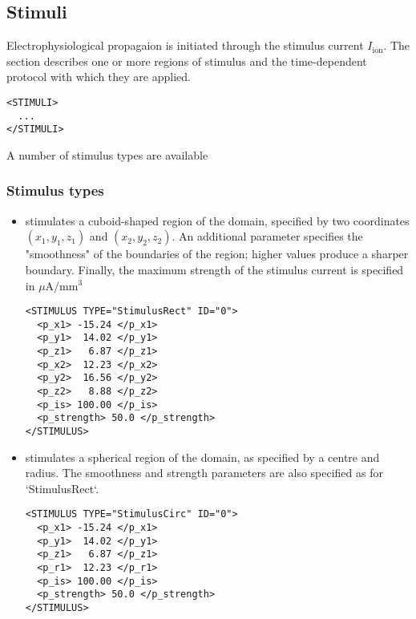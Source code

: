 \subsection{Stimuli}
Electrophysiological propagaion is initiated through the stimulus current 
$I_{\mathrm{ion}}$. The  section describes one or more regions of
stimulus and the time-dependent protocol with which they are applied.
\begin{lstlisting}[style=XmlStyle]
<STIMULI>
  ...
</STIMULI>
\end{lstlisting}
A number of stimulus types are available

\subsubsection{Stimulus types}
\begin{itemize}
    \item {} stimulates a cuboid-shaped region of the domain,
    specified by two coordinates $(x_1,y_1,z_1)$ and $(x_2,y_2,z_2)$.
    An additional parameter specifies the "smoothness" of the boundaries of the
    region; higher values produce a sharper boundary. Finally, the maximum 
    strength of the stimulus current is specified in $\mu \mathrm{A} / \mathrm{mm}^3$
\begin{lstlisting}[style=XmlStyle]
<STIMULUS TYPE="StimulusRect" ID="0">
  <p_x1> -15.24 </p_x1>
  <p_y1>  14.02 </p_y1>
  <p_z1>   6.87 </p_z1>
  <p_x2>  12.23 </p_x2>
  <p_y2>  16.56 </p_y2>
  <p_z2>   8.88 </p_z2>
  <p_is> 100.00 </p_is>
  <p_strength> 50.0 </p_strength>
</STIMULUS>
\end{lstlisting}

    \item {} stimulates a spherical region of the domain, as
    specified by a centre and radius. The smoothness and strength parameters are also specified as for `StimulusRect`.
\begin{lstlisting}[style=XmlStyle]
<STIMULUS TYPE="StimulusCirc" ID="0">
  <p_x1> -15.24 </p_x1>
  <p_y1>  14.02 </p_y1>
  <p_z1>   6.87 </p_z1>
  <p_r1>  12.23 </p_r1>
  <p_is> 100.00 </p_is>
  <p_strength> 50.0 </p_strength>
</STIMULUS>
\end{lstlisting}
\end{itemize}


